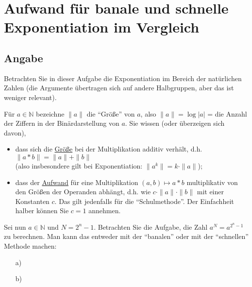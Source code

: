 \section*{Aufwand für banale und schnelle Exponentiation im Vergleich}

\subsection*{Angabe}
Betrachten Sie in dieser Aufgabe die Exponentiation im Bereich der natürlichen
Zahlen (die Argumente übertragen sich auf andere Halbgruppen, aber das ist
weniger relevant).

Für $a \in \mathbb{N}$ bezeichne $\|a\|$ die ``Größe'' von $a$, also  $\|a\| =
\log|a|$  = die Anzahl der Ziffern in der Binärdarstellung von $a$. Sie wissen
(oder überzeigen sich davon),
\begin{itemize}
\item
dass sich die \underline{Größe} bei der Multiplikation additiv verhält, d.h.
$\|a*b\|=\|a\|+\|b\|$ \\(also insbesondere gilt bei Exponentiation: $\|a^k\|= k
\cdot \|a\|$);
\item
dass der \underline{Aufwand} für eine  Multiplikation $(a,b) \mapsto a*b$
multiplikativ  von den Größen der Operanden abhängt, d.h.  wie $c \cdot \|a\|
\cdot \|b\|$ mit einer Konstanten $c$. Das gilt jedenfalls für die
``Schulmethode''.  Der Einfachheit halber können Sie $c=1$ annehmen.
\end{itemize}

Sei nun $a \in \mathbb{N}$ und $N = 2^n-1$. Betrachten Sie die Aufgabe, die
Zahl $a^N = a^{2^n-1}$ zu berechnen.  Man kann das entweder mit der ``banalen''
oder mit der ``schnellen'' Methode machen:

\begin{itemize}
\item[a)]
\begin{algorithmic}
\ENDFOR
{}
\end{algorithmic}

\item[b)]
\begin{algorithmic}
\ENDFOR
{}
\end{algorithmic}
\end{itemize}

